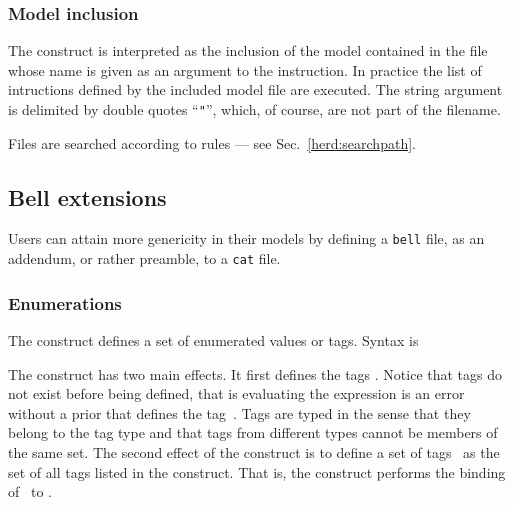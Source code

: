 \subsubsection*{Model inclusion}
The construct  is interpreted as
the inclusion of the model contained in the file whose name is given as
an argument to the  instruction.
In practice the list of intructions defined by the included model file
are executed.
The string argument is delimited by double quotes ``\verb+"+'',
which, of course, are not part of the filename.
\iftrue
Files are searched according to \herd{} rules --- see Sec.~\ref{herd:searchpath}.
\else
Notice that:
\begin{itemize}
\item Files are searched according to \herd{} rules --- see Sec.~\ref{herd:searchpath}.
\item Model options defined in the model file \synt{\nt{filename}} are ignored.
\end{itemize}
\fi

\subsection*{Bell extensions}

Users can attain more genericity in their models by defining a {\tt bell} file,
as an addendum, or rather preamble, to a {\tt cat} file.

\subsubsection*{\label{sec:enum}Enumerations}
The  construct defines a set of enumerated values or tags. Syntax is
\begin{center}
\end{center}
The construct has two main effects.
It first defines the tags .
Notice that tags do not exist before being defined, that is
evaluating the expression  is an error without a prior
 that defines the tag~. Tags are typed in the sense
that they belong to the tag type  and that tags from
different types cannot be members of the same set.
The second effect of the construct is to define a set of tags~
as the set of all tags listed in the construct.
That is, the  construct performs the binding of~
to .


